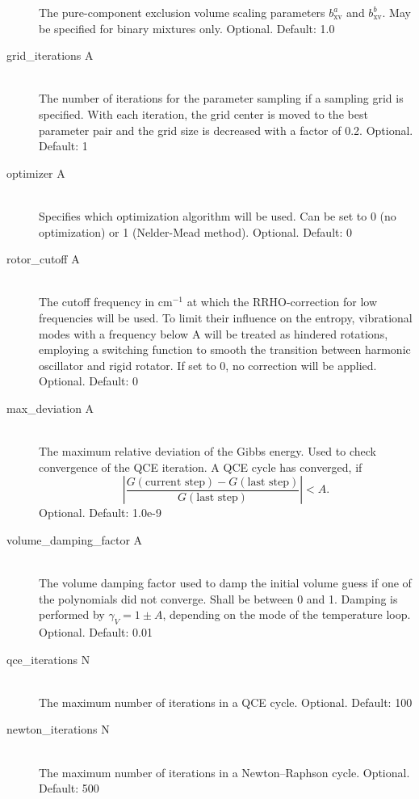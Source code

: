\documentclass{scrartcl}
\newcommand{\bxv}{b_\mathrm{xv}}
\begin{document}
\begin{description}
        The pure-component exclusion volume scaling parameters $\bxv^{a}$ and $\bxv^{b}$.
        May be specified for binary mixtures only.
        Optional. Default: 1.0
        \vspace{0.1cm}
    \item[grid\_iterations A] \hfill \\
        The number of iterations for the parameter sampling if a sampling grid is specified.
        With each iteration, the grid center is moved to the best parameter pair and the grid size is decreased with a factor of 0.2.
        Optional. Default: 1
    \item[optimizer A] \hfill \\
        Specifies which optimization algorithm will be used.
        Can be set to 0 (no optimization) or 1 (Nelder-Mead method).
        Optional. Default: 0
    \item[rotor\_cutoff A] \hfill \\
        The cutoff frequency in cm$^{-1}$ at which the RRHO-correction for low frequencies will be used.
        To limit their influence on the entropy, vibrational modes with a frequency below A will be treated as hindered rotations, employing a switching function to smooth the transition between harmonic oscillator and rigid rotator. If set to 0, no correction will be applied.
        Optional. Default: 0
    \item[max\_deviation A] \hfill \\
        The maximum relative deviation of the Gibbs energy.
        Used to check convergence of the QCE iteration.
        A QCE cycle has converged, if \[\left|\frac{G(\text{current step}) - G(\text{last step})}{G(\text{last step})}\right| < A.\]
        Optional. Default: 1.0e-9
        \vspace{0.1cm}
    \item[volume\_damping\_factor A] \hfill \\
        The volume damping factor used to damp the initial volume guess if one of the polynomials did not converge.
        Shall be between 0 and 1.
        Damping is performed by $\gamma_V = 1 \pm A$, depending on the mode of the temperature loop.
        Optional. Default: 0.01
        \vspace{0.1cm}
    \item[qce\_iterations N] \hfill \\
        The maximum number of iterations in a QCE cycle.
        Optional. Default: 100
        \vspace{0.1cm}
    \item[newton\_iterations N] \hfill \\
        The maximum number of iterations in a Newton--Raphson cycle.
        Optional. Default: 500
\end{description}
\end{document}

